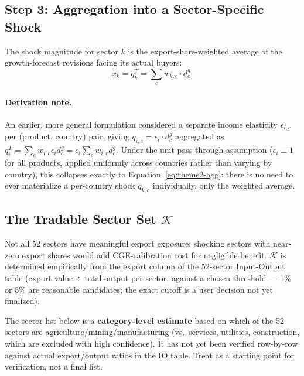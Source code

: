 \documentclass[11pt]{article}
\begin{document}
\subsection{Step 3: Aggregation into a Sector-Specific Shock}

The shock magnitude for sector $k$ is the export-share-weighted average of
the growth-forecast revisions facing its actual buyers:
\begin{equation}
  x_k = q_k^T = \sum_{c} w_{k,c} \cdot d^g_c.
  \label{eq:theme2-agg}
\end{equation}

\paragraph{Derivation note.} An earlier, more general formulation considered
a separate income elasticity $\epsilon_{i,c}$ per (product, country) pair,
giving $q_{i,c} = \epsilon_i \cdot d^g_c$ aggregated as
$q_i^T = \sum_c w_{i,c}\epsilon_i d^g_c = \epsilon_i \sum_c w_{i,c} d^g_c$.
Under the unit-pass-through assumption ($\epsilon_i \equiv 1$ for all
products, applied uniformly across countries rather than varying by
country), this collapses exactly to Equation~\eqref{eq:theme2-agg}: there is
no need to ever materialize a per-country shock $q_{k,c}$ individually, only
the weighted average.

\subsection{The Tradable Sector Set $\mathcal{K}$}
\label{sec:theme2-K}

Not all 52 sectors have meaningful export exposure; shocking sectors with
near-zero export shares would add CGE-calibration cost for negligible
benefit. $\mathcal{K}$ is determined empirically from the export column of
the 52-sector Input-Output table (export value $\div$ total output per
sector, against a chosen threshold --- 1\% or 5\% are reasonable candidates;
the exact cutoff is a user decision not yet finalized).

\begin{warningbox}
The sector list below is a \textbf{category-level estimate} based on which
of the 52 sectors are agriculture/mining/manufacturing (vs.\ services,
utilities, construction, which are excluded with high confidence). It has
not yet been verified row-by-row against actual export/output ratios in the
IO table. Treat as a starting point for verification, not a final list.
\end{warningbox}
\end{document}
